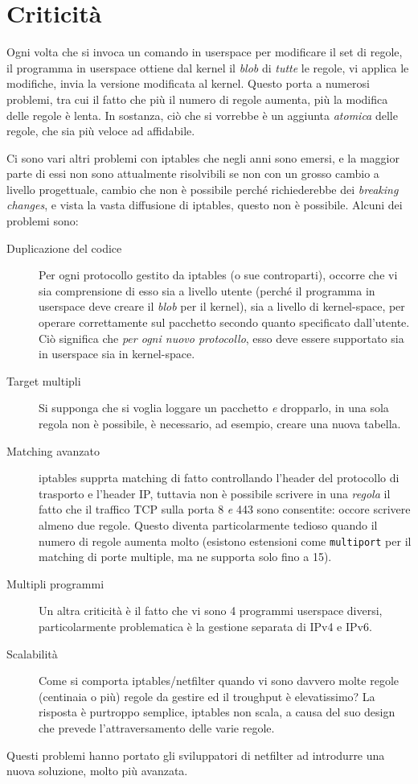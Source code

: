 \section{Criticità}
Ogni volta che si invoca un comando in userspace per modificare il set
di regole, il programma in userspace ottiene dal kernel il \textit{blob}
di \textit{tutte} le regole, vi applica le modifiche, invia la versione
modificata al kernel.
Questo porta a numerosi problemi, tra cui il fatto che più il numero di regole
aumenta, più la modifica delle regole è lenta. In sostanza, ciò che
si vorrebbe è un aggiunta \textit{atomica} delle regole, che sia
più veloce ad affidabile.

Ci sono vari altri problemi con iptables che negli anni sono emersi, e la
maggior parte di essi non sono attualmente risolvibili se non con un grosso
cambio a livello progettuale, cambio che non è possibile perché richiederebbe
dei \textit{breaking changes}, e vista la vasta diffusione di iptables, questo
non è possibile.
Alcuni dei problemi sono:
\begin{description}
  \item[Duplicazione del codice]Per ogni protocollo gestito da iptables (o sue
  controparti), occorre che vi sia comprensione di esso sia a livello
  utente (perché il programma in userspace deve creare il \textit{blob} per
  il kernel), sia a livello di kernel-space, per operare correttamente sul pacchetto
  secondo quanto specificato dall'utente.\\
  Ciò significa che \textit{per ogni nuovo protocollo}, esso deve essere
  supportato sia in userspace sia in kernel-space.
  \item[Target multipli]Si supponga che si voglia loggare un pacchetto
  \textit{e} dropparlo, in una sola regola non è possibile, è necessario, ad
  esempio, creare una nuova tabella.
  \item[Matching avanzato]iptables supprta matching di fatto controllando l'header
  del protocollo di trasporto e l'header IP, tuttavia non è possibile scrivere
  in una \textit{regola} il fatto che il traffico TCP sulla porta 8 \textit{e}
  443 sono consentite: occore scrivere almeno due regole. Questo diventa
  particolarmente tedioso quando il numero di regole aumenta molto (esistono
  estensioni come \texttt{multiport} per il matching di porte multiple, ma ne
  supporta solo fino a 15).
  \item[Multipli programmi]Un altra criticità è il fatto che vi sono 4 programmi
  userspace diversi, particolarmente problematica è la gestione separata di IPv4
  e IPv6.
  \item[Scalabilità]Come si comporta iptables/netfilter quando vi sono
  davvero molte regole (centinaia o più) regole da gestire ed il troughput
  è elevatissimo? La risposta è purtroppo semplice, iptables non scala, a causa
  del suo design che prevede l'attraversamento delle varie regole.
\end{description}

Questi problemi hanno portato gli sviluppatori di netfilter ad introdurre
una nuova soluzione, molto più avanzata.
